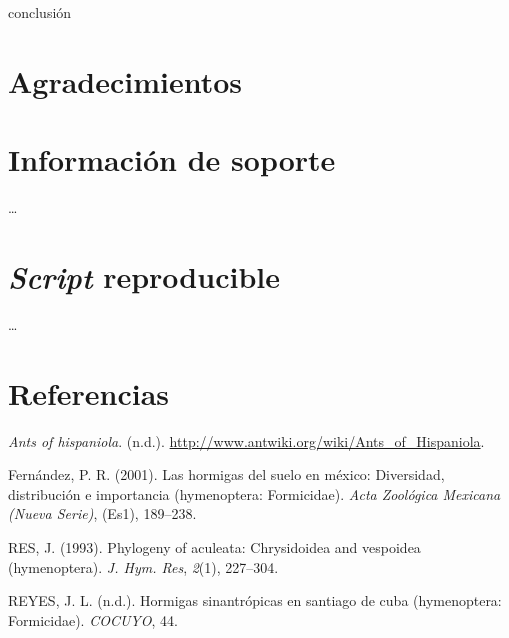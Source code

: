 \documentclass[11pt,]{article}
\begin{document}
conclusión

\section{Agradecimientos}\label{agradecimientos}

\section{Información de soporte}\label{informaciuxf3n-de-soporte}

\ldots

\section{\texorpdfstring{\emph{Script}
reproducible}{Script reproducible}}\label{script-reproducible}

\ldots

\section*{Referencias}\label{referencias}

\hypertarget{refs}{}
\hypertarget{ref-Antwiki}{}
\emph{Ants of hispaniola}. (n.d.).
\url{http://www.antwiki.org/wiki/Ants_of_Hispaniola}.

\hypertarget{ref-fernandez2001hormigas}{}
Fernández, P. R. (2001). Las hormigas del suelo en méxico: Diversidad,
distribución e importancia (hymenoptera: Formicidae). \emph{Acta
Zoológica Mexicana (Nueva Serie)}, (Es1), 189--238.

\hypertarget{ref-res1993phylogeny}{}
RES, J. (1993). Phylogeny of aculeata: Chrysidoidea and vespoidea
(hymenoptera). \emph{J. Hym. Res}, \emph{2}(1), 227--304.

\hypertarget{ref-reyeshormigas}{}
REYES, J. L. (n.d.). Hormigas sinantrópicas en santiago de cuba
(hymenoptera: Formicidae). \emph{COCUYO}, 44.




\newpage
\singlespacing 
\end{document}
